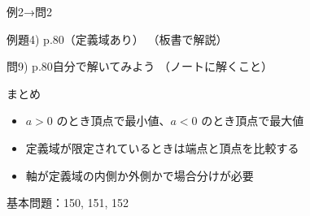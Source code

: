 \documentclass[aspectratio=43,professionalfonts,handout]{beamer}
\begin{document}
\begin{frame}{例2→問2}
  \begin{exampleblock}{例題4) p.80（定義域あり）}
    （板書で解説）
  \end{exampleblock}

  \vfill

  \begin{block}{問9) p.80\quad 自分で解いてみよう}
    （ノートに解くこと）
  \end{block}
\end{frame}

\begin{frame}{まとめ}
  \begin{itemize}
    \item $a>0$ のとき頂点で最小値、$a<0$ のとき頂点で最大値
    \item 定義域が限定されているときは端点と頂点を比較する
    \item 軸が定義域の内側か外側かで場合分けが必要
  \end{itemize}

  \vfill
  {\small 基本問題：150, 151, 152}
\end{frame}
\end{document}
